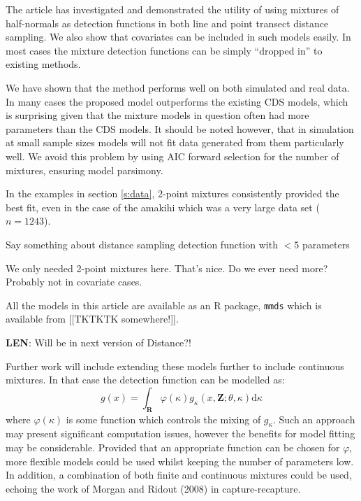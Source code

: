 \documentclass[useAMS,referee, usegraphicx]{biom}
\begin{document}
The article has investigated and demonstrated the utility of using mixtures of half-normals as detection functions in both line and point transect distance sampling. We also show that covariates can be included in such models easily. In most cases the mixture detection functions can be simply ``dropped in'' to existing methods.

We have shown that the method performs well on both simulated and real data. In many cases the proposed model outperforms the existing CDS models, which is surprising given that the mixture models in question often had more parameters than the CDS models. It should be noted however, that in simulation at small sample sizes models will not fit data generated from them particularly well. We avoid this problem by using AIC forward selection for the number of mixtures, ensuring model parsimony.

In the examples in section \ref{s:data}, 2-point mixtures consistently provided the best fit, even in the case of the amakihi which was a very large data set ($n=1243$). 

Say something about distance sampling detection function with $<5$ parameters


We only needed 2-point mixtures here. That's nice. Do we ever need more? Probably not in covariate cases.

All the models in this article are available as an \textsf{R} package, \texttt{mmds} which is available from [[TKTKTK somewhere!]].

\textbf{LEN}: Will be in next version of Distance?!

Further work will include extending these models further to include continuous mixtures. In that case the detection function can be modelled as:
\begin{equation*}
g(x) = \int_\mathbf{R} \varphi(\kappa) g_\kappa(x,\mathbf{Z}; \theta, \kappa) \text{d}\kappa
\end{equation*}
where $\varphi(\kappa)$ is some function which controls the mixing of $g_\kappa$. Such an approach may present significant computation issues, however the benefits for model fitting may be considerable. Provided that an appropriate function can be chosen for $\varphi$, more flexible models could be used whilst keeping the number of parameters low. In addition, a combination of both finite and continuous mixtures could be used, echoing the work of Morgan and Ridout (2008) in capture-recapture.



\end{document}
